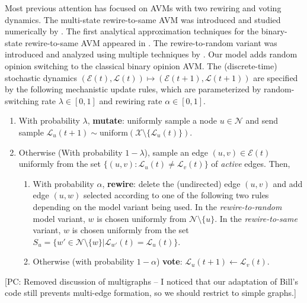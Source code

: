 \documentclass[review, onefignum, onetabnum]{siamart171218}
\newcommand{\pc}[1]{{\color{comment_purple}[PC: #1]}}
\begin{document}
	Most previous attention has focused on AVMs with two rewiring and voting dynamics. 
	The multi-state rewire-to-same AVM was introduced and studied numerically by \cite{Holme2006}.
	The first analytical approximation techniques for the binary-state rewire-to-same AVM appeared in \cite{Kimura2008}. 
	The rewire-to-random variant was introduced and analyzed using multiple techniques by \cite{Durrett2012}.  
	Our model adds random opinion switching to the classical binary opinion AVM.	
	The (discrete-time) stochastic dynamics $(\mathcal{E}(t), \mathcal{L}(t)) \mapsto (\mathcal{E}(t+1), \mathcal{L}(t+1))$ are specified by the following mechanistic update rules, which are parameterized by random-switching rate $\lambda \in [0,1]$ and rewiring rate $\alpha\in [0,1]$. 
		\begin{enumerate}
			\item With probability $\lambda$, \textbf{mutate}: uniformly sample a node $u\in \mathcal{N}$ and send sample $\mathcal{L}_u(t+1)  \sim \mathrm{uniform}(\mathcal{X}\setminus \{\mathcal{L}_u(t)\})$.  
			\item Otherwise (With probability $1-\lambda$),  sample an edge $(u,v) \in \mathcal{E}(t)$ uniformly from the set $\{(u,v):\mathcal{L}_u(t) \neq \mathcal{L}_v(t)\}$ of \emph{active} edges. Then, 
			\begin{enumerate}
				\item With probability $\alpha$, \textbf{rewire}: delete the (undirected) edge $(u,v)$ and add edge $(u,w)$ selected according to one of the following two rules depending on the model variant being used. 
				In the \emph{rewire-to-random} model variant, $w$ is chosen uniformly from $\mathcal{N}\setminus \{u\}$. 
				In the \emph{rewire-to-same} variant, $w$ is chosen uniformly from the set $S_u = \{w' \in \mathcal{N}\setminus \{w\} | \mathcal{L}_{w'}(t) = \mathcal{L}_u(t)\}$. 
				\item Otherwise (with probability $1-\alpha$) \textbf{vote}:  $\mathcal{L}_u(t+1) \gets \mathcal{L}_v(t)$. 
			\end{enumerate}
			

		\end{enumerate}
	\pc{Removed discussion of multigraphs -- I noticed that our adaptation of Bill's code still prevents multi-edge formation, so we should restrict to simple graphs.}
	
\end{document}
